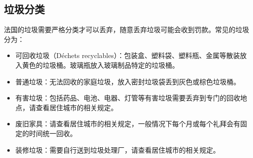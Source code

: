 \subsection{垃圾分类}

法国的垃圾需要严格分类才可以丢弃，随意丢弃垃圾可能会收到罚款。常见的垃圾分为：

\begin{itemize}
    \item 可回收垃圾（Déchets recyclables）：包装盒、塑料袋、塑料瓶、金属等散装放入黄色的垃圾桶。玻璃瓶放入玻璃制品特定的垃圾桶。
    \item 普通垃圾：无法回收的家庭垃圾，放入密封垃圾袋丢到灰色或棕色垃圾桶。
    \item 有害垃圾：包括药品、电池、电器、灯管等有害垃圾需要丢弃到专门的回收地点，请查看居住城市的相关规定。
    \item 废旧家具：请查看居住城市的相关规定，一般情况下每个月或每个礼拜会有固定的时间统一回收。
    \item 装修垃圾：需要自行送到垃圾处理厂，请查看居住城市的相关规定。
\end{itemize}
